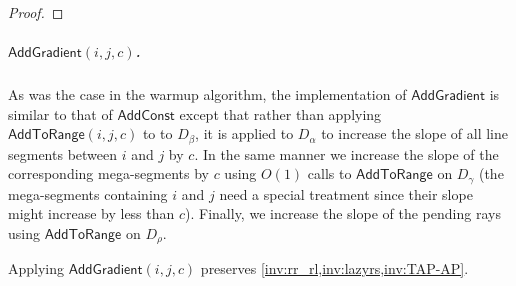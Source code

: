 \documentclass[a4paper,UKenglish,cleveref, autoref, thm-restate]{lipics-v2021}
\newcommand{\AC}{\mathsf{AddConst}}
\newcommand{\AtR}{\mathsf{AddToRange}}
\newcommand{\AG}{\mathsf{AddGradient}}
\newcommand{\para}[1]{\vspace{-0.1in} \subparagraph*{#1}}
\begin{document}
\begin{proof}
\end{proof}

\para{$\AG(i,j,c)$.}
As was the case in the warmup algorithm, the implementation of $\AG$ is similar to that of $\AC$ except that rather than applying $\AtR(i,j,c)$ to to $D_\beta$, it is applied to $D_\alpha$ to increase the slope of all line segments between $i$ and $j$ by $c$. In the same manner we increase the slope of the corresponding mega-segments by $c$ using $O(1)$ calls to $\AtR$ on $D_\gamma$ (the mega-segments containing $i$ and $j$ need a special treatment since their slope might increase by less than $c$).
Finally, we increase the slope of the pending rays using $\AtR$ on $D_\rho$. 

\begin{lemma}\label{lem:addgrad}
    Applying $\AG(i,j,c)$ preserves \cref{inv:rr_rl,inv:lazyrs,inv:TAP-AP}.
\end{lemma}
\end{document}
